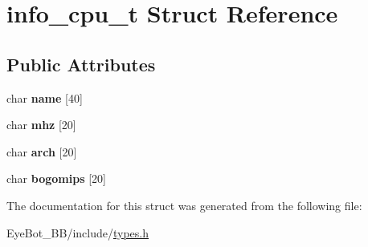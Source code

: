 \hypertarget{structinfo__cpu__t}{\section{info\-\_\-cpu\-\_\-t \-Struct \-Reference}
\label{structinfo__cpu__t}
}
\subsection*{\-Public \-Attributes}
\begin{DoxyCompactItemize}
\item 
\hypertarget{structinfo__cpu__t_a81a7c07193c0676b1d372cb359209d47}{char {\bfseries name} \mbox{[}40\mbox{]}}\label{structinfo__cpu__t_a81a7c07193c0676b1d372cb359209d47}

\item 
\hypertarget{structinfo__cpu__t_af7d5ae341f6adbed683149839138c096}{char {\bfseries mhz} \mbox{[}20\mbox{]}}\label{structinfo__cpu__t_af7d5ae341f6adbed683149839138c096}

\item 
\hypertarget{structinfo__cpu__t_aace9a1738c9874992179b17be82a3b69}{char {\bfseries arch} \mbox{[}20\mbox{]}}\label{structinfo__cpu__t_aace9a1738c9874992179b17be82a3b69}

\item 
\hypertarget{structinfo__cpu__t_a917f477456065779e97a5652203dfdc1}{char {\bfseries bogomips} \mbox{[}20\mbox{]}}\label{structinfo__cpu__t_a917f477456065779e97a5652203dfdc1}

\end{DoxyCompactItemize}


\-The documentation for this struct was generated from the following file\-:\begin{DoxyCompactItemize}
\item 
\-Eye\-Bot\-\_\-\-B\-B/include/\hyperlink{types_8h}{types.\-h}\end{DoxyCompactItemize}
